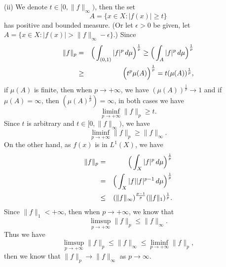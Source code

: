 \documentclass[12pt,a4paper]{ctexart}
\begin{document}
(ii) We denote $t \in [0, \|f \|_{\infty})$, then the set 
\begin{equation*}
   A = \{x \in X: |f(x)| \geq t \}
\end{equation*}
has positive and bounded measure. (Or let $\epsilon > 0$ be given, let $A = \{ x \in X : |f(x)| > \|f\|_{\infty} - \epsilon \}$.) Since
\begin{eqnarray*}
\|f\|_{p} & = & \Big{(} \int_{(0, 1)}^{} |f|^{p} \, d \mu \Big{)}^{\frac{1}{p}} \geq \Big{(} \int_{A}^{} |f|^{p} \, d \mu \Big{)}^{\frac{1}{p}} \\
& \geq & \Big{(} t^{p} \mu(A)\Big{)}^{\frac{1}{p}} = t (\mu(A))^{\frac{1}{p}},
\end{eqnarray*}
if $\mu(A)$ is finite, then when $p \to + \infty$, we have $(\mu(A))^{\frac{1}{p}} \to 1$ and if $\mu(A) = \infty$, then $(\mu(A)^{\frac{1}{p}}) = \infty$, in both cases we have
\begin{equation*}
   \liminf_{p \to + \infty} \|f\|_{p} \geq t.
\end{equation*}
Since $t$ is arbitrary and $t \in [0, \|f \|_{\infty})$, we have
\begin{equation*}
   \liminf_{p \to + \infty} \|f\|_{p} \geq \|f \|_{\infty} .
\end{equation*}
On the other hand, as $f(x)$ is in $L^{1}(X)$, we have
\begin{eqnarray*}
    \|f\|_{p} &=& \Big{(} \int_{X}^{} |f|^{p} \, d \mu \Big{)}^{\frac{1}{p}} \\
    &=& \Big{(} \int_{X}^{} |f| |f|^{p-1} \, d \mu \Big{)}^{\frac{1}{p}} \\
    & \leq &  (\|f\|_{\infty})^{\frac{p-1}{p}} (\|f\|_{1})^{\frac{1}{p}} .
\end{eqnarray*}
Since $\|f\|_{1} < + \infty$, then when $p \to + \infty$, we know that
\begin{equation*}
   \limsup_{p \to + \infty} \|f\|_{p} \leq \|f \|_{\infty} .
\end{equation*}
Thus we have
\begin{equation*}
   \limsup_{p \to + \infty} \|f\|_{p} \leq \|f \|_{\infty} \leq \liminf_{p \to + \infty} \|f\|_{p},
\end{equation*}
then we know that $\|f \|_{p} \rightarrow \|f \|_{\infty}$ as $p \rightarrow \infty$.
\end{document}

